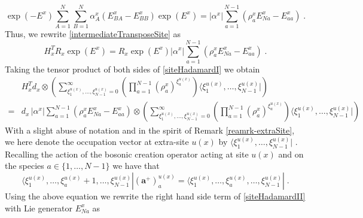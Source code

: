 \documentclass[10pt]{article}
\numberwithin{equation}{section}
\numberwithin{equation}{subsection}
\newcommand{\dt}{\;.}
\begin{document}
\begin{equation}\label{HadTransfBoundary}
\exp{(-E^{x})}\sum_{A=1}^{N}\sum_{B=1}^{N}\alpha_{A}^{x}\left(E_{B A}^{x}-E_{BB}^{x}\right)\exp{(E^{x})}=	|\alpha^{x}|\sum_{a=1}^{N-1}\left(\rho_{a}^{x}E_{Na}^{x}-E_{aa}^{x}\right)\dt
\end{equation}
Thus, we rewrite \eqref{intermediateTransposeSite} as
\begin{equation}\label{siteHadamardI}
H_{x}^{T}R_{x}\exp{(E^{x})}=R_{x}\exp{(E^{x})}|\alpha^{x}|\sum_{a=1}^{N-1}\left(\rho_{a}^{x}E_{Na}^{x}-E_{aa}^{x}\right)\dt
\end{equation}
Taking the tensor product of both sides of  \eqref{siteHadamardI} 
we obtain 
\begin{equation}\label{siteHadamardII}
    \begin{split}
    	&H_{x}^{T}d_{x}\otimes\left(\sum_{\xi_{1}^{u(x)},\ldots,\xi_{N-1}^{u(x)}=0}^{\infty}\left(\prod_{a=1}^{N-1}\left(\rho_{a}^{x}\right)^{\xi_{a}^{u(x)}}\right)\langle \xi_{1}^{u(x)},\ldots,\xi_{N-1}^{u(x)}|\right)\\=&
 d_{x}\,
|\alpha^{x}|\sum_{a=1}^{N-1}\left(\rho_{a}^{x}E_{Na}^{x}-E_{aa}^{x}\right)\otimes \left(\sum_{\xi_{1}^{u(x)},\ldots,\xi_{N-1}^{u(x)}=0}^{\infty}\left(\prod_{a=1}^{N-1}\left(\rho_{a}^{x}\right)^{\xi_{a}^{u(x)}}\right)\langle \xi_{1}^{u(x)},\ldots,\xi_{N-1}^{u(x)}|\right)
    \end{split}
\end{equation}
{With a slight abuse of notation and in the spirit of Remark \ref{reamrk-extraSite}, we here denote the occupation vector at extra-site $u(x)$ by $\langle \xi_{1}^{u(x)},\ldots,\xi_{N-1}^{u(x)}|$ 
.
} 
Recalling the action of the bosonic creation operator acting at site $u(x)$ and on the species $a\in \{1,\ldots,N-1\}$ we have that 
\begin{equation}\label{bosonicKX}
    \langle \xi_{1}^{u(x)},\ldots,\xi_{a}^{u(x)}+1,\ldots,\xi_{N-1}^{u(x)}|(\mathbf{a}^{+})^{u(x)}_{a}=  \langle \xi_{1}^{u(x)},\ldots,\xi_{a}^{u(x)},\ldots,\xi_{N-1}^{u(x)}|\dt
\end{equation}
Using the above equation we rewrite the right hand side term of \eqref{siteHadamardII} with Lie generator $E_{Na}^{x}$ as 
\end{document}
